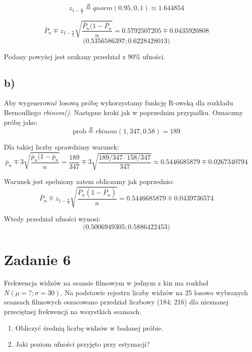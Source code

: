\documentclass{article}
\begin{document}
\[ z_{1-\frac{\alpha}{2}} \overset{R}{=} qnorm(0.95, 0, 1) \approx 1.644854 \]

\[ \overline{P}_n \mp z_{1-\frac{\alpha}{2}} \sqrt{\frac{\overline{P}_n(1-\overline{P}_n}{n}} = 0.5792507205 \mp 0.0435920808\]
\[ \Big( 0.5356586397 ; 0.6228428013 \Big) \]

Podany powyżej jest szukany przedział z 90\% ufności.

\subsection{b)}
Aby wygenerować losową próbę wykorzystamy funkcję R-owską dla rozkładu Bernoulliego \textit{rbinom()}. Następne kroki jak w poprzednim przypadku. Oznaczmy próbę jako:
\[ \text{prob} \overset{R}{=} rbinom(1, 347, 0.58) = 189 \]

Dla takiej liczby sprawdzimy warunek:
\[ \overline{p}_n \mp 3\sqrt{\frac{\overline{p}_n(1-\overline{p}_n}{n}} = \frac{189}{347} \mp 3\sqrt{\frac{189/347\cdot 158/347}{347}} \approx 0.5446685879 \mp 0.0267340794 \]

Warunek jest spełniony zatem obliczamy jak poprzednio:
\[ \overline{P}_n \mp z_{1-\frac{\alpha}{2}} \sqrt{\frac{\overline{P}_n(1-\overline{P}_n) }{n}} = 0.5446685879 \mp 0.0439736574\]

Wtedy przedział ufności wynosi:
\[ \Big( 0.5006949305 ; 0.5886422453 \Big) \]

\section{Zadanie 6}
Frekwencja widzów na seansie filmowym w jednym z kin ma rozkład $N(\mu=?;\sigma=30)$. Na podstawie rejestru liczby widzów na 25 losowo wybranych seansach filmowych oszacowano przedział liczbowy (184; 216) dla nieznanej przeciętnej frekwencji na wszystkich seansach.
\begin{enumerate}[label = \alph*)]
\item Obliczyć średnią liczbę widzów w badanej próbie.
\item Jaki poziom ufności przyjęto przy estymacji?
\end{enumerate}
\end{document}
